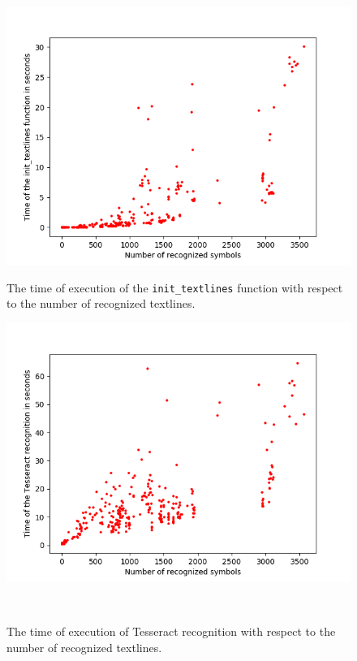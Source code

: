 \begin{figure}[t]
    \centering
    \includegraphics[width=\linewidth]{img/results/symbolsTimeInit.png}
    \caption{The time of execution of the \texttt{init\_textlines} function with respect to the number of recognized textlines.}
    \label{fig:symbolsTimeInit}
\endminipage\hfill
{}
    \includegraphics[width=\linewidth]{img/results/symbolsTimeTesseract.png}
    \caption{The time of execution of Tesseract recognition with respect to the number of recognized textlines.}
    \label{fig:symbolsTimeTess}
\endminipage\\

\end{figure}
